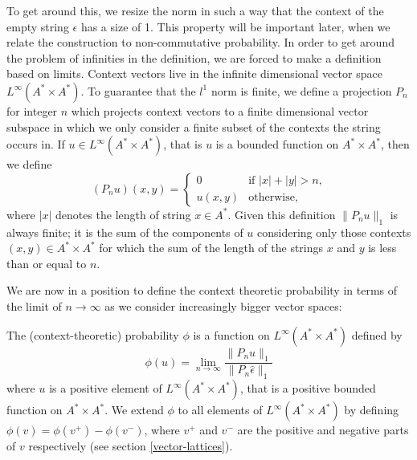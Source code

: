 

To get around this, we resize the norm in such a way that the context of the empty string $\epsilon$ has a size of 1. This property will be important later, when we relate the construction to non-commutative probability. In order to get around the problem of infinities in the definition, we are forced to make a definition based on limits. Context vectors live in the infinite dimensional vector space $L^\infty(A^*\times A^*)$. To guarantee that the $l^1$ norm is finite, we define a projection $P_n$ for integer $n$ which projects context vectors to a finite dimensional vector subspace in which we only consider a finite subset of the contexts the string occurs in. If $u \in L^\infty(A^*\times A^*)$, that is $u$ is a bounded function on $A^*\times A^*$, then we define
$$(P_n u)(x,y) = \begin{cases}
	0 & \text{if $|x| + |y| > n$,}\\
	u(x,y) & \text{otherwise,}
\end{cases}$$
where $|x|$ denotes the length of string $x\in A^*$. Given this definition $\|P_n u\|_1$ is always finite; it is the sum of the components of $u$ considering only those contexts $(x,y) \in A^*\times A^*$ for which the sum of the length of the strings $x$ and $y$ is less than or equal to $n$.

We are now in a position to define the context theoretic probability in terms of the limit of $n\rightarrow \infty$ as we consider increasingly bigger vector spaces:
\begin{defn}
The (context-theoretic) probability $\phi$ is a function on $L^\infty(A^*\times A^*)$ defined by
$$\phi(u) = \lim_{n\rightarrow\infty} \frac{\|P_n u\|_1}{\|P_n\hat{\epsilon}\|_1}$$
where $u$ is a positive element of $L^\infty(A^*\times A^*)$, that is a positive bounded function on $A^*\times A^*$. We extend $\phi$ to all elements of $L^\infty(A^*\times A^*)$ by defining $\phi(v) = \phi(v^+) - \phi(v^-)$, where $v^+$ and $v^-$ are the positive and negative parts of $v$ respectively (see section \ref{vector-lattices}).
\end{defn}

